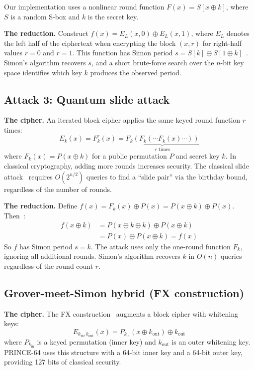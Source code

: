 \documentclass[11pt]{article}
\begin{document}
Our implementation uses a nonlinear round function $F(x) = S[x \oplus k]$, where $S$ is a random S-box and $k$ is the secret key.

\textbf{The reduction.} Construct $f(x) = E_L(x, 0) \oplus E_L(x, 1)$, where $E_L$ denotes the left half of the ciphertext when encrypting the block $(x, r)$ for right-half values $r = 0$ and $r = 1$. This function has Simon period $s = S[k] \oplus S[1 \oplus k]$~\cite{kuwakado2010,kaplan2016}. Simon's algorithm recovers $s$, and a short brute-force search over the $n$-bit key space identifies which key $k$ produces the observed period.

\subsection{Attack 3: Quantum slide attack}

\textbf{The cipher.} An iterated block cipher applies the same keyed round function $r$ times:
\begin{equation}
    E_k(x) = F_k^r(x) = \underbrace{F_k(F_k(\cdots F_k(x)\cdots))}_{r \text{ times}}
\end{equation}
where $F_k(x) = P(x \oplus k)$ for a public permutation $P$ and secret key $k$. In classical cryptography, adding more rounds increases security. The classical slide attack~\cite{biryukov1999} requires $O(2^{n/2})$ queries to find a ``slide pair'' via the birthday bound, regardless of the number of rounds.

\textbf{The reduction.} Define $f(x) = F_k(x) \oplus P(x) = P(x \oplus k) \oplus P(x)$. Then~\cite{kaplan2016,bonnetain2019}:
\begin{align}
    f(x \oplus k) &= P(x \oplus k \oplus k) \oplus P(x \oplus k) \nonumber \\
    &= P(x) \oplus P(x \oplus k) = f(x)
\end{align}
So $f$ has Simon period $s = k$. The attack uses only the one-round function $F_k$, ignoring all additional rounds. Simon's algorithm recovers $k$ in $O(n)$ queries regardless of the round count $r$.

\subsection{Grover-meet-Simon hybrid (FX construction)}

\textbf{The cipher.} The FX construction~\cite{kilian1996} augments a block cipher with whitening keys:
\begin{equation}
    E_{k_{\text{in}}, k_{\text{out}}}(x) = P_{k_{\text{in}}}(x \oplus k_{\text{out}}) \oplus k_{\text{out}}
\end{equation}
where $P_{k_{\text{in}}}$ is a keyed permutation (inner key) and $k_{\text{out}}$ is an outer whitening key. PRINCE-64 uses this structure with a 64-bit inner key and a 64-bit outer key, providing 127 bits of classical security.
\end{document}
